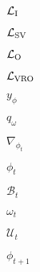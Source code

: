 $\mathcal{L}_{\rm I}$

$\mathcal{L}_{\rm SV}$

$\mathcal{L}_{\rm O}$

$\mathcal{L}_{\rm VRO}$

$y_\phi$

$q_\omega$

$\nabla_{\phi_t}$

$\phi_t$

$\mathcal{B}_t$

$\omega_t$

$\mathcal{U}_t$

$\phi_{t+1}$